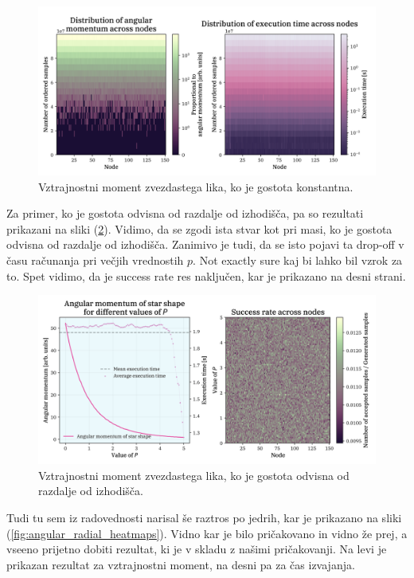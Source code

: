 \documentclass[a4paper]{article}
\begin{document}
\begin{figure}[H]
    \centering
    \includegraphics[width=\textwidth]{../StarShapes/Images/angular_const_heatmaps.png}
    \caption{Vztrajnostni moment zvezdastega lika, ko je gostota konstantna.}
    \label{fig:angular_const_heatmaps}
\end{figure}

Za primer, ko je gostota odvisna od razdalje od izhodišča, pa so rezultati prikazani na sliki (\ref{fig:angular_radial}).
Vidimo, da se zgodi ista stvar kot pri masi, ko je gostota odvisna od razdalje od izhodišča. Zanimivo je tudi, da se isto 
pojavi ta drop-off v času računanja pri večjih vrednostih $p$. Not exactly sure kaj bi lahko bil vzrok za to. Spet 
vidimo, da je success rate res naključen, kar je prikazano na desni strani. \\

\begin{figure}[H]
    \centering
    \includegraphics[width=\textwidth]{../StarShapes/Images/angular_radial.png}
    \caption{Vztrajnostni moment zvezdastega lika, ko je gostota odvisna od razdalje od izhodišča.}
    \label{fig:angular_radial}
\end{figure}

Tudi tu sem iz radovednosti narisal še raztros po jedrih, kar je prikazano na sliki (\ref{fig:angular_radial_heatmaps}).
Vidno kar je bilo pričakovano in vidno že prej, a vseeno prijetno dobiti rezultat, ki je v skladu z našimi pričakovanji.
Na levi je prikazan rezultat za vztrajnostni moment, na desni pa za čas izvajanja. \\
\end{document}
